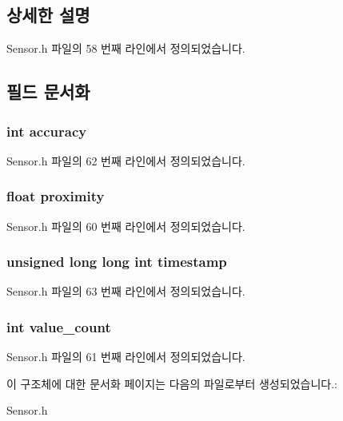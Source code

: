 \subsection{상세한 설명}


Sensor.\-h 파일의 58 번째 라인에서 정의되었습니다.



\subsection{필드 문서화}
\hypertarget{struct___proximity__data_a5565cf9073275f9713f9016e7c10d25f}{
\subsubsection[{accuracy}]{\setlength{\rightskip}{0pt plus 5cm}int accuracy}}\label{struct___proximity__data_a5565cf9073275f9713f9016e7c10d25f}


Sensor.\-h 파일의 62 번째 라인에서 정의되었습니다.

\hypertarget{struct___proximity__data_a5767a762273412ecff24202966e9d67b}{
\subsubsection[{proximity}]{\setlength{\rightskip}{0pt plus 5cm}float proximity}}\label{struct___proximity__data_a5767a762273412ecff24202966e9d67b}


Sensor.\-h 파일의 60 번째 라인에서 정의되었습니다.

\hypertarget{struct___proximity__data_a8de02c4128636a7bf630ff5428f60c8d}{
\subsubsection[{timestamp}]{\setlength{\rightskip}{0pt plus 5cm}unsigned long long int timestamp}}\label{struct___proximity__data_a8de02c4128636a7bf630ff5428f60c8d}


Sensor.\-h 파일의 63 번째 라인에서 정의되었습니다.

\hypertarget{struct___proximity__data_a40a079bfc72408819dc78da308203a74}{
\subsubsection[{value\-\_\-count}]{\setlength{\rightskip}{0pt plus 5cm}int value\-\_\-count}}\label{struct___proximity__data_a40a079bfc72408819dc78da308203a74}


Sensor.\-h 파일의 61 번째 라인에서 정의되었습니다.



이 구조체에 대한 문서화 페이지는 다음의 파일로부터 생성되었습니다.\-:\begin{DoxyCompactItemize}
\item 
Sensor.\-h\end{DoxyCompactItemize}
